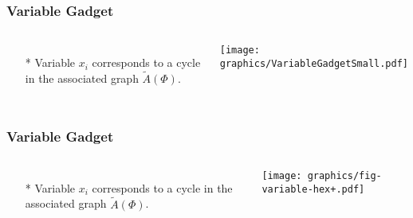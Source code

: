 \documentclass{beamer}
\begin{document}

\begin{frame} \frametitle{Variable Gadget}
    \begin{columns}[c]
        \begin{itemize}
            \item[*] Variable $x_i$ corresponds to a cycle in the associated graph $\tilde{A}(\Phi)$. 
        \end{itemize}
                    \begin{minipage}{\linewidth}
            \begin{center}
            \texttt{[image: graphics/VariableGadgetSmall.pdf]}
            \end{center}
        \end{minipage}
    \end{columns}
\end{frame}

\begin{frame} \frametitle{Variable Gadget}
    \begin{columns}[c]
        \begin{itemize}
            \item[*] Variable $x_i$ corresponds to a cycle in the associated graph $\tilde{A}(\Phi)$. 
        \end{itemize}
                    \begin{minipage}{\linewidth}
            \begin{center}
            \texttt{[image: graphics/fig-variable-hex+.pdf]}
            \end{center}
        \end{minipage}
    \end{columns}
\end{frame}
\end{document}
